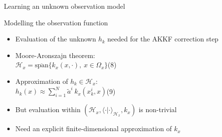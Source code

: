 \documentclass[9pt]{beamer}
\begin{document}
\begin{frame}{Learning an unknown observation model}

\begin{block}{Modelling the observation function}
    \begin{itemize}
    \item Evaluation of the unknown $h_k$ needed for the AKKF correction step
    \item Moore-Aronszajn theorem:\\
    \hfill$\mathcal{H}_x=\overline{\text{span}}\{k_x(x,\cdot),\:x\in\Omega_x\}$\hfill(8)
    \item Approximation of $h_k\in\mathcal{H}_x$:\\
    \hfill$\displaystyle h_k(x)\approx\sum_{i=1}^{N}\tilde{a}^i\:k_x(x_k^i,x)$\hfill(9)
    \item But evaluation within $(\mathcal{H}_x,\langle\cdot|\cdot\rangle_{\mathcal{H}_x},k_x)$ is non-trivial
    \item[$\Rightarrow$]Need an explicit finite-dimensional approximation of $k_x$
    \end{itemize}
\end{block}

\end{frame}
\end{document}
